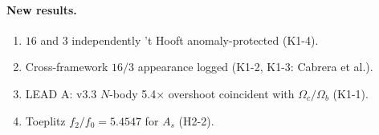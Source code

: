 \documentclass[11pt]{article}
\begin{document}
\paragraph{New results.}
\begin{enumerate}\itemsep1pt
  \item $16$ and $3$ independently 't Hooft anomaly-protected (K1-4).
  \item Cross-framework $16/3$ appearance logged (K1-2, K1-3: Cabrera et al.).
  \item LEAD A: v3.3 $N$-body 5.4$\times$ overshoot coincident with $\Omega_c/\Omega_b$ (K1-1).
  \item Toeplitz $f_2/f_0 = 5.4547$ for $A_s$ (H2-2).
\end{enumerate}
\end{document}
